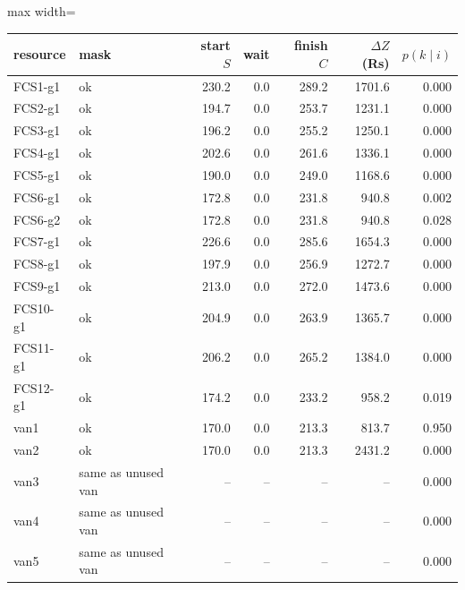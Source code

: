 \footnotesize\begin{adjustbox}{max width=\linewidth}\begin{tabular}{@{}llrrrrr@{}}\toprule
resource & mask & start $S$ & wait & finish $C$ & $\Delta Z$ (Rs) & $p(k\mid i)$ \\\midrule
FCS1-g1 & ok & 230.2 & 0.0 & 289.2 & 1701.6 & 0.000 \\
FCS2-g1 & ok & 194.7 & 0.0 & 253.7 & 1231.1 & 0.000 \\
FCS3-g1 & ok & 196.2 & 0.0 & 255.2 & 1250.1 & 0.000 \\
FCS4-g1 & ok & 202.6 & 0.0 & 261.6 & 1336.1 & 0.000 \\
FCS5-g1 & ok & 190.0 & 0.0 & 249.0 & 1168.6 & 0.000 \\
FCS6-g1 & ok & 172.8 & 0.0 & 231.8 & 940.8 & 0.002 \\
FCS6-g2 & ok & 172.8 & 0.0 & 231.8 & 940.8 & 0.028 \\
FCS7-g1 & ok & 226.6 & 0.0 & 285.6 & 1654.3 & 0.000 \\
FCS8-g1 & ok & 197.9 & 0.0 & 256.9 & 1272.7 & 0.000 \\
FCS9-g1 & ok & 213.0 & 0.0 & 272.0 & 1473.6 & 0.000 \\
FCS10-g1 & ok & 204.9 & 0.0 & 263.9 & 1365.7 & 0.000 \\
FCS11-g1 & ok & 206.2 & 0.0 & 265.2 & 1384.0 & 0.000 \\
FCS12-g1 & ok & 174.2 & 0.0 & 233.2 & 958.2 & 0.019 \\
van1 & ok & 170.0 & 0.0 & 213.3 & 813.7 & 0.950 \\
van2 & ok & 170.0 & 0.0 & 213.3 & 2431.2 & 0.000 \\
van3 & same as unused van & -- & -- & -- & -- & 0.000 \\
van4 & same as unused van & -- & -- & -- & -- & 0.000 \\
van5 & same as unused van & -- & -- & -- & -- & 0.000 \\
\bottomrule\end{tabular}\end{adjustbox}
